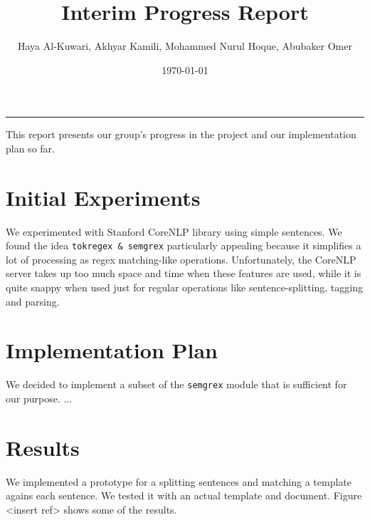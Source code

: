 \documentclass{article}
\title{Interim Progress Report}
\author{Haya Al-Kuwari, Akhyar Kamili, Mohammed Nurul Hoque, Abubaker Omer}
\date{\today}
\begin{document}
    \maketitle
    \noindent\rule{\textwidth}{1pt}
    This report presents our group's progress in the project and our implementation plan so far.

    \section{Initial Experiments}
    We experimented with Stanford CoreNLP library using simple sentences. We found the idea
    \texttt{tokregex \& semgrex} particularly appealing because it simplifies a lot of processing as
    regex matching-like operations. Unfortunately, the CoreNLP server takes up too much space and
    time when these features are used, while it is quite snappy when used just for regular
    operations like sentence-splitting, tagging and parsing.

    \section{Implementation Plan}
    We decided to implement a subset of the \texttt{semgrex} module that is sufficient for our purpose. ...

    \section{Results}
    We implemented a prototype for a splitting sentences and matching a template agains each
    sentence. We tested it with an actual template and document. Figure <insert ref> shows some of
    the results.
    
\end{document}
